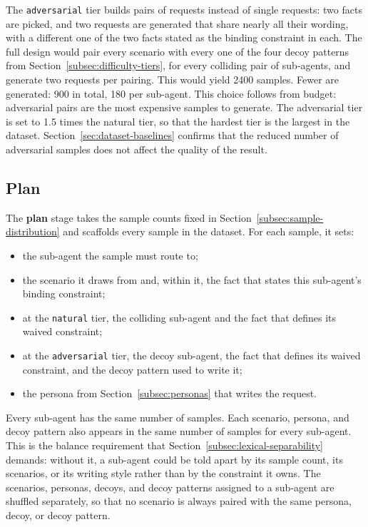 The \texttt{adversarial} tier builds pairs of requests instead of single requests: two facts are picked, and two requests are generated that share nearly all their wording, with a different one of the two facts stated as the binding constraint in each. The full design would pair every scenario with every one of the four decoy patterns from Section~\ref{subsec:difficulty-tiers}, for every colliding pair of sub-agents, and generate two requests per pairing. This would yield 2400 samples. Fewer are generated: 900 in total, 180 per sub-agent. This choice follows from budget: adversarial pairs are the most expensive samples to generate. The adversarial tier is set to 1.5 times the natural tier, so that the hardest tier is the largest in the dataset. Section~\ref{sec:dataset-baselines} confirms that the reduced number of adversarial samples does not affect the quality of the result.

\subsection{Plan}
\label{subsec:pipeline-plan}

The \textbf{plan} stage takes the sample counts fixed in Section~\ref{subsec:sample-distribution} and scaffolds every sample in the dataset. For each sample, it sets:

\begin{itemize}
    \item the sub-agent the sample must route to;
    \item the scenario it draws from and, within it, the fact that states this sub-agent's binding constraint;
    \item at the \texttt{natural} tier, the colliding sub-agent and the fact that defines its waived constraint;
    \item at the \texttt{adversarial} tier, the decoy sub-agent, the fact that defines its waived constraint, and the decoy pattern used to write it;
    \item the persona from Section~\ref{subsec:personas} that writes the request.
\end{itemize}

Every sub-agent has the same number of samples. Each scenario, persona, and decoy pattern also appears in the same number of samples for every sub-agent. This is the balance requirement that Section~\ref{subsec:lexical-separability} demands: without it, a sub-agent could be told apart by its sample count, its scenarios, or its writing style rather than by the constraint it owns. The scenarios, personas, decoys, and decoy patterns assigned to a sub-agent are shuffled separately, so that no scenario is always paired with the same persona, decoy, or decoy pattern.

